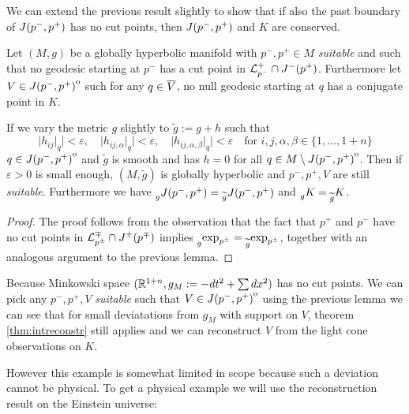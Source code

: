 We can extend the previous result slightly to show that if also the past boundary of $J(p^-,p^+)$ has no cut points, then $J(p^-,p^+)$ and $K$ are conserved.
\begin{corollary}\label{cor:suitablestable}
    Let $(M,g)$ be a globally hyperbolic manifold with $p^-,p^+\in M$ \emph{suitable} and such that no geodesic starting at $p^-$ has a cut point in ${\mathcal{L}}^+_{p^-}\cap J^-(p^+)$. Furthermore let $V\in {\kern0ptJ(p^-,p^+)}^{\mathrm{o}}$ such for any $q\in {\overline{V}}$, no null geodesic starting at $q$ has a conjugate point in $K$.
    
    If we vary the metric $g$ slightly to $\widetilde{g}:=g+h$ such that 
    \[
        \lvert h_{ij}\rvert_q \rvert <\varepsilon, \quad \lvert h_{ij,\alpha}\rvert_q \rvert <\varepsilon, \quad \lvert h_{ij,\alpha,\beta}\rvert_q \rvert <\varepsilon \quad \text{for } i,j,\alpha,\beta\in \{1,\dots, 1+n\}
    \] $q\in {\kern0ptJ(p^-,p^+)}^{\mathrm{o}}$
    and $\widetilde{g}$ is smooth and has $h=0$ for all $q\in M\setminus {\kern0ptJ(p^-,p^+)}^{\mathrm{o}}$. Then if $\varepsilon>0$ is small enough, $(M,\widetilde{g})$ is globally hyperbolic and $p^-,p^+,V$ are still \emph{suitable}. Furthermore we have $\prescript{}{g}{J(p^-,p^+)}=\prescript{}{\widetilde{g}}{J(p^-,p^+)}$ and $\prescript{}{g}{K}=\prescript{}{\widetilde{g}}{K}$.
\end{corollary}
\begin{proof}
    The proof follows from the observation that the fact that $p^+$ and $p^-$ have no cut points in ${\mathcal{L}}^\mp_{p^\pm} \cap J^\pm(p^\mp)$ implies $\prescript{}{g}{\exp_{p^\pm}}= \prescript{}{\widetilde{g}}{\exp_{p^\pm}}$, together with an analogous argument to the previous lemma.
\end{proof}

\begin{example}
    Because Minkowski space $(\mathbb{R}^{1+n}, g_M:=-dt^2 + \sum dx^2)$ has no cut points. We can pick any $p^-,p^+,V$ \emph{suitable} such that $V\in {\kern0ptJ(p^-,p^+)}^{\mathrm{o}}$ using the previous lemma we can see that for small deviatations from $g_M$ with support on $V$, theorem \ref{thm:intreconstr} still applies and we can reconstruct $V$ from the light cone observations on $K$.
\end{example}



However this example is somewhat limited in scope because such a deviation cannot be physical. To get a physical example we will use the reconstruction result on the Einstein universe:

